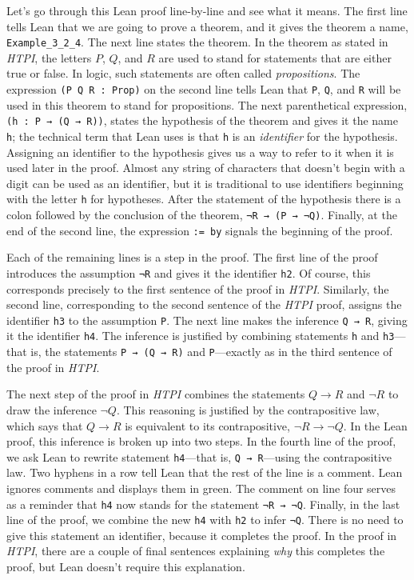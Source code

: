 \documentclass[
  letterpaper,
  DIV=11,
  numbers=noendperiod]{scrreprt}
\begin{document}
Let's go through this Lean proof line-by-line and see what it means. The
first line tells Lean that we are going to prove a theorem, and it gives
the theorem a name, \texttt{Example\_3\_2\_4}. The next line states the
theorem. In the theorem as stated in \emph{HTPI}, the letters \(P\),
\(Q\), and \(R\) are used to stand for statements that are either true
or false. In logic, such statements are often called
\emph{propositions}. The expression \texttt{(P\ Q\ R\ :\ Prop)} on the
second line tells Lean that \texttt{P}, \texttt{Q}, and \texttt{R} will
be used in this theorem to stand for propositions. The next
parenthetical expression, \texttt{(h\ :\ P\ →\ (Q\ →\ R))}, states the
hypothesis of the theorem and gives it the name \texttt{h}; the
technical term that Lean uses is that \texttt{h} is an \emph{identifier}
for the hypothesis. Assigning an identifier to the hypothesis gives us a
way to refer to it when it is used later in the proof. Almost any string
of characters that doesn't begin with a digit can be used as an
identifier, but it is traditional to use identifiers beginning with the
letter \texttt{h} for hypotheses. After the statement of the hypothesis
there is a colon followed by the conclusion of the theorem,
\texttt{¬R\ →\ (P\ →\ ¬Q)}. Finally, at the end of the second line, the
expression \texttt{:=\ by} signals the beginning of the proof.

Each of the remaining lines is a step in the proof. The first line of
the proof introduces the assumption \texttt{¬R} and gives it the
identifier \texttt{h2}. Of course, this corresponds precisely to the
first sentence of the proof in \emph{HTPI}. Similarly, the second line,
corresponding to the second sentence of the \emph{HTPI} proof, assigns
the identifier \texttt{h3} to the assumption \texttt{P}. The next line
makes the inference \texttt{Q\ →\ R}, giving it the identifier
\texttt{h4}. The inference is justified by combining statements
\texttt{h} and \texttt{h3}---that is, the statements
\texttt{P\ →\ (Q\ →\ R)} and \texttt{P}---exactly as in the third
sentence of the proof in \emph{HTPI}.

The next step of the proof in \emph{HTPI} combines the statements
\(Q \to R\) and \(\neg R\) to draw the inference \(\neg Q\). This
reasoning is justified by the contrapositive law, which says that
\(Q \to R\) is equivalent to its contrapositive, \(\neg R \to \neg Q\).
In the Lean proof, this inference is broken up into two steps. In the
fourth line of the proof, we ask Lean to rewrite statement
\texttt{h4}---that is, \texttt{Q\ →\ R}---using the contrapositive law.
Two hyphens in a row tell Lean that the rest of the line is a comment.
Lean ignores comments and displays them in green. The comment on line
four serves as a reminder that \texttt{h4} now stands for the statement
\texttt{¬R\ →\ ¬Q}. Finally, in the last line of the proof, we combine
the new \texttt{h4} with \texttt{h2} to infer \texttt{¬Q}. There is no
need to give this statement an identifier, because it completes the
proof. In the proof in \emph{HTPI}, there are a couple of final
sentences explaining \emph{why} this completes the proof, but Lean
doesn't require this explanation.
\end{document}
